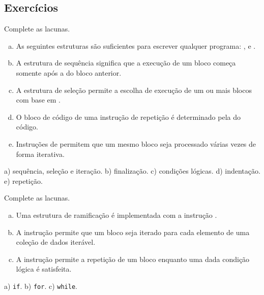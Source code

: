 \subsection{Exercícios}


\begin{exer}
  Complete as lacunas.
  \begin{enumerate}[a)]
    \item As seguintes estruturas são suficientes para escrever qualquer programa: \underline{\phantom{sequência}}, \underline{\phantom{seleção}} e \underline{\phantom{iteração}}.
    \item A estrutura de sequência significa que a execução de um bloco começa somente após a \underline{\phantom{finalização}} do bloco anterior.
    \item A estrutura de seleção permite a escolha de execução de um ou mais blocos com base em \underline{\phantom{condições lógicas}}.
    \item O bloco de código de uma instrução de repetição é determinado pela \underline{\phantom{indentação}} do código.
    \item Instruções de \underline{\phantom{repetição}} permitem que um mesmo bloco seja processado várias vezes de forma iterativa.
  \end{enumerate}
\end{exer}
\begin{resp}
  a) sequência, seleção e iteração. b) finalização. c) condições lógicas. d) indentação. e) repetição.
\end{resp}

\begin{exer}
  Complete as lacunas.
  \begin{enumerate}[a)]
    \item Uma estrutura de ramificação é implementada com a instrução \underline{}.
    \item A instrução \underline{} permite que um bloco seja iterado para cada elemento de uma coleção de dados iterável.
    \item A instrução \underline{} permite a repetição de um bloco enquanto uma dada condição lógica é satisfeita.
  \end{enumerate}
\end{exer}
\begin{resp}
  a) \texttt{if}. b) \texttt{for}. c) \texttt{while}.
\end{resp}

